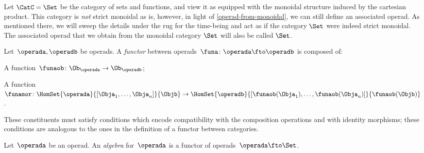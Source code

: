 \begin{example}
    Let $\CatC = \Set$ be the category of sets and functions, and view it as equipped with the monoidal structure induced by the cartesian product. This category is \emph{not} strict monoidal as is, however, in light of \cref{operad-from-monoidal}, we can still define an associated operad. As mentioned there, we will sweep the details under the rug for the time-being and act as if the category $\Set$ were indeed strict monoidal. The associated operad that we obtain from the monoidal category $\Set$ will also be called $\Set$.
\end{example}

\begin{ctdefinition}
    \label{def:functors_operads}
    Let~$\operada,\operadb$ be operads. A \emph{functor} between operads~$\funa\colon \operada \fto \operadb$  is composed of:
    \begin{compactenum}
        \item A function~$\funaob\colon \Ob_\operada\to \Ob_\operadb$;
        \item A function~$\funamor\colon \HomSet{\operada}{[\Obja_1,\ldots,\Obja_n]}{\Objb}\to \HomSet{\operadb}{[\funaob(\Obja_1),\ldots, \funaob(\Obja_n)]}{\funaob(\Objb)}$.
    \end{compactenum}
    These constituents must satisfy conditions which encode compatibility with the composition operations and with identity morphisms; these conditions are analogous to the ones in the definition of a functor between categories.
\end{ctdefinition}


\begin{definition}
    \label{def:algebra_operad}
    Let~$\operada$ be an operad. An \emph{algebra} for~$\operada$ is a functor of operads~$\operada \fto \Set$.
\end{definition}


